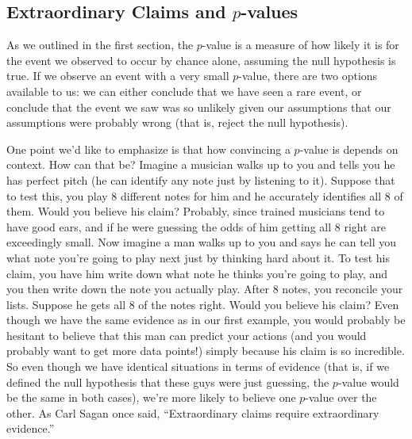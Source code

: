 
\subsection{Extraordinary Claims and $p$-values}



As we outlined in the first section, the $p$-value is a measure of how likely it is for the event we observed to occur by chance alone, assuming the null hypothesis is true. If we observe an event with a very small $p$-value, there are two options available to us: we can either conclude that we have seen a rare event, or conclude that the event we saw was so unlikely given our assumptions that our assumptions were probably wrong (that is, reject the null hypothesis).



One point we'd like to emphasize is that how convincing a $p$-value is depends on context. How can that be? Imagine a musician walks up to you and tells you he has perfect pitch (he can identify any note just by listening to it). Suppose that to test this, you play 8 different notes for him and he accurately identifies all 8 of them. Would you believe his claim? Probably, since trained musicians tend to have good ears, and if he were guessing the odds of him getting all 8 right are exceedingly small. Now imagine a man walks up to you and says he can tell you what note you're going to play next just by thinking hard about it. To test his claim, you have him write down what note he thinks you're going to play, and you then write down the note you actually play. After 8 notes, you reconcile your lists. Suppose he gets all 8 of the notes right. Would you believe his claim? Even though we have the same evidence as in our first example, you would probably be hesitant to believe that this man can predict your actions (and you would probably want to get more data points!) simply because his claim is so incredible. So even though we have identical situations in terms of evidence (that is, if we defined the null hypothesis that these guys were just guessing, the $p$-value would be the same in both cases), we're more likely to believe one $p$-value over the other. As Carl Sagan once said, ``Extraordinary claims require extraordinary evidence.''







